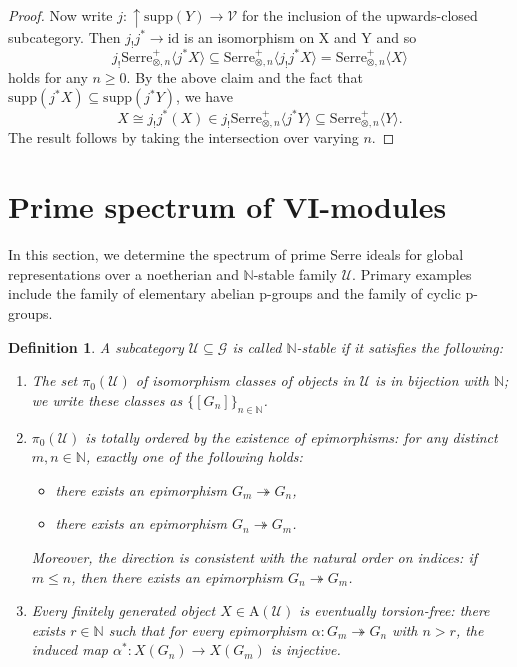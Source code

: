 \documentclass[11pt,a4paper]{amsart}
\numberwithin{equation}{section} \theoremstyle{plain}
\newtheorem{definition}[lem]{Definition}
\newenvironment{df}{\begin{definition}\rm}{\end{definition}}
\begin{document}
\begin{proof}
Now write $j:\uparrow \mathrm{supp}(Y)\rightarrow \mathcal{V}$ for the inclusion of the upwards-closed subcategory. Then $j_{!}j^{*}\rightarrow \mathrm{id}$ is an isomorphism on X and Y and so $$j_{!}\mathrm{Serre}_{\otimes,n}^{+}\langle j^{*}X\rangle\subseteq \mathrm{Serre}_{\otimes,n}^{+}\langle j_{!}j^{*}X\rangle=\mathrm{Serre}_{\otimes,n}^{+}\langle X\rangle$$ holds for any $n\geq 0$. By the above claim and the fact that $\mathrm{supp}(j^{*}X)\subseteq \mathrm{supp}(j^{*}Y)$, we have $$X\cong j_{!}j^{*}(X)\in j_{!}\mathrm{Serre}_{\otimes,n}^{+}\langle j^{*}Y\rangle\subseteq \mathrm{Serre}_{\otimes,n}^{+}\langle Y\rangle.$$
The result follows by taking the intersection over varying $n$.
\end{proof}


 \section{\bf Prime spectrum of VI-modules}
In this section, we determine the spectrum of prime Serre ideals for global representations over a noetherian and $\mathbb{N}$-stable family $\mathcal{U}$. Primary examples include the family of elementary abelian p-groups and the family of cyclic p-groups.

\begin{df}\label{df 5.1}
A subcategory $\mathcal{U} \subseteq \mathcal{G}$ is called $\mathbb{N}$-stable if it satisfies the following:
\begin{enumerate}
    \item  The set $\pi_{0}(\mathcal{U})$ of isomorphism classes of objects in $\mathcal{U}$ is in bijection with $\mathbb{N}$; we write these classes as $\{[G_n]\}_{n \in \mathbb{N}}$.
    \item $\pi_{0}(\mathcal{U})$ is totally ordered by the existence of epimorphisms:
          for any distinct $m, n \in \mathbb{N}$, exactly one of the following holds:
          \begin{itemize}
              \item there exists an epimorphism $G_m \twoheadrightarrow G_n$,
              \item there exists an epimorphism $G_n \twoheadrightarrow G_m$.
          \end{itemize}
          Moreover, the direction is consistent with the natural order on indices: if $m \le n$, then there exists an epimorphism $G_n \twoheadrightarrow G_m$.
    \item Every finitely generated object $X \in \mathrm{A}(\mathcal{U})$ is eventually torsion-free: there exists $r \in \mathbb{N}$ such that for every epimorphism $\alpha: G_m \twoheadrightarrow G_n$ with $n > r$, the induced map $\alpha^{*}: X(G_n) \rightarrow X(G_m)$ is injective.
\end{enumerate}
\end{df}
\end{document}
